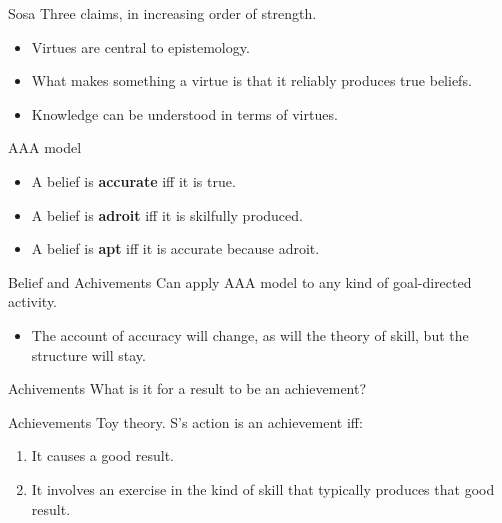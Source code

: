\documentclass[
  17pt,
  letterpaper,
  ignorenonframetext,
  aspectratio=169,
]{beamer}
\providecommand{\tightlist}{%
  \setlength{\itemsep}{0pt}\setlength{\parskip}{0pt}}\usepackage{longtable,booktabs,array}
\begin{document}
\begin{frame}{Sosa}
\protect\hypertarget{sosa}{}
Three claims, in increasing order of strength.

\begin{itemize}[<+->]
\tightlist
\item
  Virtues are central to epistemology.
\item
  What makes something a virtue is that it reliably produces true
  beliefs.
\item
  Knowledge can be understood in terms of virtues.
\end{itemize}
\end{frame}

\begin{frame}{AAA model}
\protect\hypertarget{aaa-model}{}
\begin{itemize}[<+->]
\tightlist
\item
  A belief is \textbf{accurate} iff it is true.
\item
  A belief is \textbf{adroit} iff it is skilfully produced.
\item
  A belief is \textbf{apt} iff it is accurate because adroit.
\end{itemize}
\end{frame}

\begin{frame}{Belief and Achivements}
\protect\hypertarget{belief-and-achivements}{}
Can apply AAA model to any kind of goal-directed activity.

\begin{itemize}[<+->]
\tightlist
\item
  The account of accuracy will change, as will the theory of skill, but
  the structure will stay.
\end{itemize}
\end{frame}

\begin{frame}{Achivements}
\protect\hypertarget{achivements}{}
What is it for a result to be an achievement?
\end{frame}

\begin{frame}{Achievements}
\protect\hypertarget{achievements}{}
Toy theory. S's action is an achievement iff:

\begin{enumerate}[<+->]
\tightlist
\item
  It causes a good result.
\item
  It involves an exercise in the kind of skill that typically produces
  that good result.
\end{enumerate}
\end{frame}
\end{document}
